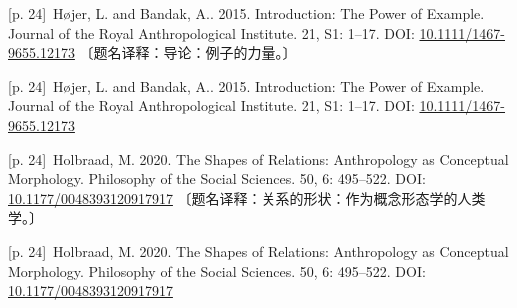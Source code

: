 \documentclass[10pt,a4paper]{article}
\begin{document}
\noindent\begin{minipage}{\textwidth}\begin{minipage}[t]{\dimexpr.5\textwidth-4mm\relax}\noindent\begin{minipage}[t]{\linewidth}{\scriptsize\color{gray} [p. 24]}\ Højer, L. and Bandak, A.. 2015. Introduction: The Power of Example. Journal of the Royal Anthropological Institute. 21, S1: 1–17. DOI: \url{10.1111/1467-9655.12173} 〔题名译释：导论：例子的力量。〕\par\end{minipage}\par\end{minipage}\hfill\begin{minipage}[t]{\dimexpr.5\textwidth-4mm\relax}\noindent\begin{minipage}[t]{\linewidth}{\scriptsize\color{gray} [p. 24]}\ Højer, L. and Bandak, A.. 2015. Introduction: The Power of Example. Journal of the Royal Anthropological Institute. 21, S1: 1–17. DOI: \url{10.1111/1467-9655.12173}\par\end{minipage}\par\end{minipage}\end{minipage}\par
\noindent\begin{minipage}{\textwidth}\begin{minipage}[t]{\dimexpr.5\textwidth-4mm\relax}\noindent\begin{minipage}[t]{\linewidth}{\scriptsize\color{gray} [p. 24]}\ Holbraad, M. 2020. The Shapes of Relations: Anthropology as Conceptual Morphology. Philosophy of the Social Sciences. 50, 6: 495–522. DOI: \url{10.1177/0048393120917917} 〔题名译释：关系的形状：作为概念形态学的人类学。〕\par\end{minipage}\par\end{minipage}\hfill\begin{minipage}[t]{\dimexpr.5\textwidth-4mm\relax}\noindent\begin{minipage}[t]{\linewidth}{\scriptsize\color{gray} [p. 24]}\ Holbraad, M. 2020. The Shapes of Relations: Anthropology as Conceptual Morphology. Philosophy of the Social Sciences. 50, 6: 495–522. DOI: \url{10.1177/0048393120917917}\par\end{minipage}\par\end{minipage}\end{minipage}\par
\end{document}
